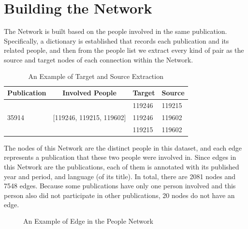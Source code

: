 \documentclass[12pt,a4paper,oneside]{book}
\begin{document}
\begin{sloppypar}
\section{Building the Network}
The Network is built based on the people involved in the same publication. Specifically, a dictionary is established that records each publication and its related people, and then from the people list we extract every kind of pair as the source and target nodes of each connection within the Network.

\begin{table}[H]
\centering
\caption{An Example of Target and Source Extraction}
\label{tab:exampleTarSour}
\begin{tabular}{llll}
\multicolumn{1}{c}{\textbf{Publication}} & \multicolumn{1}{c}{\textbf{Involved People}}  & \multicolumn{1}{c}{\textbf{Target}} & \multicolumn{1}{c}{\textbf{Source}} \\ \hline
\multirow{3}{*}{35914}                   & \multirow{3}{*}{{[}119246, 119215, 119602{]}} & 119246                              & 119215                              \\
                                         &                                               & 119246                              & 119602                              \\
                                         &                                               & 119215                              & 119602                             
\end{tabular}
\end{table}

The nodes of this Network are the distinct people in this dataset, and each edge represents a publication that these two people were involved in. Since edges in this Network are the publications, each of them is annotated with its published year and period, and language (of its title). In total, there are 2081 nodes and 7548 edges. Because some publications have only one person involved and this person also did not participate in other publications, 20 nodes do not have an edge.

\begin{figure}[H]
\centering

\caption{An Example of Edge in the People Network}
\label{fig:examplePeoNet}
\end{figure}


\end{sloppypar}
\end{document}
